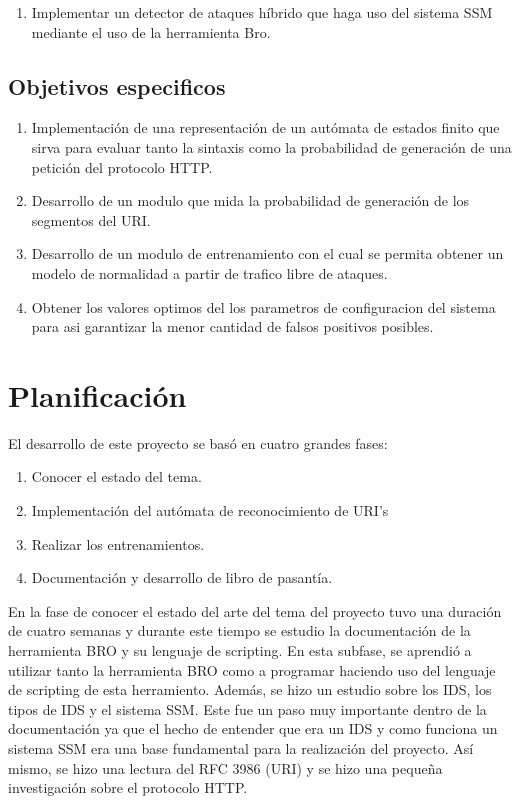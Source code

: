 \documentclass{article}
\begin{document}
\begin{enumerate}
  \item Implementar un detector de ataques híbrido que haga uso del sistema SSM mediante el uso de la herramienta Bro.
\end{enumerate}


\subsection{Objetivos especificos}


\begin{enumerate}
  \item Implementación de una representación de un autómata de estados finito que sirva para evaluar tanto la sintaxis como la probabilidad de generación de una petición del protocolo HTTP.\\
  \item Desarrollo de un modulo que mida la probabilidad de generación de los segmentos del URI.\\
  \item Desarrollo de un modulo de entrenamiento con el cual se permita obtener un modelo de normalidad a partir de trafico libre de ataques.\\
  \item Obtener los valores optimos del los parametros de configuracion del sistema para asi garantizar la menor cantidad de falsos positivos posibles.\\
\end{enumerate}

\section{Planificaci\'on}

El desarrollo de este proyecto se bas\'o en cuatro grandes fases:
\begin{enumerate}
\item Conocer el estado  del tema.
\item Implementación del autómata de reconocimiento de URI's
\item Realizar los entrenamientos.
\item Documentación y desarrollo de libro de pasantía.
\end{enumerate}

En la fase de conocer el estado del arte del tema del proyecto tuvo una duraci\'on de cuatro semanas y durante este tiempo se estudio la documentaci\'on de la herramienta BRO y su lenguaje de scripting. En esta subfase, se aprendi\'o a utilizar tanto la herramienta BRO como a programar haciendo uso del lenguaje de scripting de esta herramiento. Adem\'as, se hizo un estudio sobre los IDS, los tipos de IDS y el sistema SSM. 
Este fue un paso muy importante dentro de la documentaci\'on ya que el hecho de entender que era un IDS y como funciona un sistema SSM era una base fundamental para la realizaci\'on del proyecto. As\'i mismo, se hizo una lectura del RFC 3986 (URI) y se hizo una pequeña investigaci\'on sobre el protocolo HTTP.\\
\end{document}
